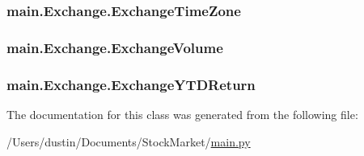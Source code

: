 \subsubsection[{Exchange\+Time\+Zone}]{\setlength{\rightskip}{0pt plus 5cm}main.\+Exchange.\+Exchange\+Time\+Zone}\label{classmain_1_1_exchange_ab68c3a3baf8465ac26661f56a9fa28b3}
\hypertarget{classmain_1_1_exchange_acc3365ded1f538e66d855ba914a875a3}{}
\subsubsection[{Exchange\+Volume}]{\setlength{\rightskip}{0pt plus 5cm}main.\+Exchange.\+Exchange\+Volume}\label{classmain_1_1_exchange_acc3365ded1f538e66d855ba914a875a3}
\hypertarget{classmain_1_1_exchange_a87fff5cef509f114a947dd71a251fe58}{}
\subsubsection[{Exchange\+Y\+T\+D\+Return}]{\setlength{\rightskip}{0pt plus 5cm}main.\+Exchange.\+Exchange\+Y\+T\+D\+Return}\label{classmain_1_1_exchange_a87fff5cef509f114a947dd71a251fe58}


The documentation for this class was generated from the following file\+:\begin{DoxyCompactItemize}
\item 
/\+Users/dustin/\+Documents/\+Stock\+Market/\hyperlink{main_8py}{main.\+py}\end{DoxyCompactItemize}
